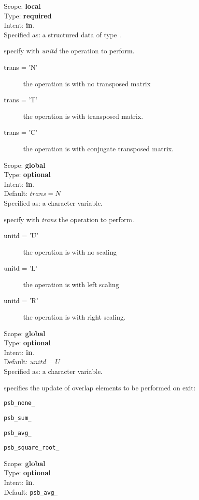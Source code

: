 \begin{description}
Scope: {\bf local} \\
Type: {\bf required}\\
Intent: {\bf in}.\\
Specified as: a structured data of type \descdata.
\item[trans] specify with {\em unitd} the operation to perform.
\begin{description}
\item[trans = 'N'] the operation is with no transposed matrix
\item[trans = 'T'] the operation is with transposed matrix.
\item[trans = 'C'] the operation is with conjugate transposed matrix.
\end{description}
Scope: {\bf global} \\
Type: {\bf optional}\\	
Intent: {\bf in}.\\
Default: $trans = N$\\	
Specified as: a character variable.
\item[unitd] specify with {\em trans} the operation to perform.
\begin{description}
\item[unitd = 'U'] the operation is with no scaling
\item[unitd = 'L'] the operation is with left scaling
\item[unitd = 'R'] the operation is with right scaling.
\end{description}
Scope: {\bf global} \\
Type: {\bf optional}\\	
Intent: {\bf in}.\\
Default: $unitd = U$\\	
Specified as: a character variable.
\item[choice] specifies the update of overlap elements to be performed
  on exit:
\begin{description}
\item \verb|psb_none_|
\item \verb|psb_sum_|
\item \verb|psb_avg_|
\item \verb|psb_square_root_|
\end{description}
Scope: {\bf global} \\
Type: {\bf optional}\\	
Intent: {\bf in}.\\
Default: \verb|psb_avg_|\\	

\end{description}
